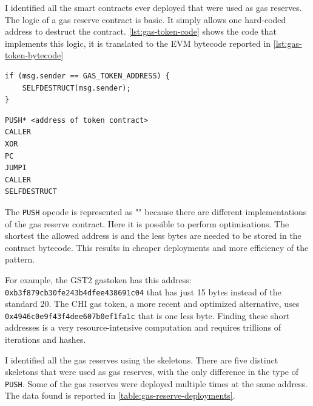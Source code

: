 I identified all the smart contracts ever deployed that were used as gas reserves. The logic of a gas reserve contract is basic. It simply allows one hard-coded address to destruct the contract. \cref{lst:gas-token-code} shows the code that implements this logic, it is translated to the EVM bytecode reported in \cref{lst:gas-token-bytecode}

\begin{lstlisting}[caption={Pseudo code of the gas reserves.},label={lst:gas-token-code},captionpos=b,numbers=none]
if (msg.sender == GAS_TOKEN_ADDRESS) {
    SELFDESTRUCT(msg.sender);
}
\end{lstlisting}

\begin{lstlisting}[caption={EVM bytecode of the gas reserves.},label={lst:gas-token-bytecode},captionpos=b,numbers=none]
PUSH* <address of token contract>
CALLER
XOR
PC
JUMPI
CALLER
SELFDESTRUCT
\end{lstlisting}

The {\tt PUSH} opcode is represented as "{\tt *}" because there are different implementations of the gas reserve contract. Here it is possible to perform optimisations. The shortest the allowed address is and the less bytes are needed to be stored in the contract bytecode. This results in cheaper deployments and more efficiency of the pattern.

For example, the GST2 gastoken has this address: \\{\tt 0xb3f879cb30fe243b4dfee438691c04} that has just 15 bytes instead of the standard 20. The CHI gas token, a more recent and optimized alternative, uses\\ {\tt 0x4946c0e9f43f4dee607b0ef1fa1c} that is one less byte. Finding these short addresses is a very resource-intensive computation and requires trillions of iterations and hashes.

I identified all the gas reserves using the skeletons. There are five distinct skeletons that were used as gas reserves, with the only difference in the type of {\tt PUSH}. Some of the gas reserves were deployed multiple times at the same address. The data found is reported in \cref{table:gas-reserve-deployments}.

